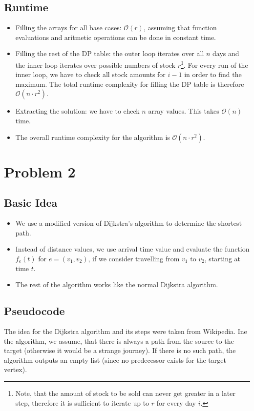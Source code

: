 \documentclass[12pt]{article}
\begin{document}
\subsection*{Runtime}
\begin{itemize}
	\item Filling the arrays for all base cases: $\mathcal{O}(r)$, assuming that function evaluations and aritmetic operations can be done in constant time.
	\item Filling the rest of the DP table: the outer loop iterates over all $n$ days and the inner loop iterates over possible numbers of stock $r$\footnote{Note, that the amount of stock to be sold can never get greater in a later step, therefore it is sufficient to iterate up to $r$ for every day $i$.}. For every run of the inner loop, we have to check all stock amounts for $i-1$ in order to find the maximum. The total runtime complexity for filling the DP table is therefore $\mathcal{O}(n \cdot r^2)$.
	\item Extracting the solution: we have to check $n$ array values. This takes $\mathcal{O}(n)$ time.
	\item The overall runtime complexity for the algorithm is $\mathcal{O}(n \cdot r^2)$.
\end{itemize}

\section*{Problem 2}
\subsection*{Basic Idea}
\begin{itemize}
	\item We use a modified version of Dijkstra's algorithm to determine the shortest path.
	\item Instead of distance values, we use arrival time value and evaluate the function $f_e(t)$ for $e=(v_1, v_2)$, if we consider travelling from $v_1$ to $v_2$, starting at time $t$.
	\item The rest of the algorithm works like the normal Dijkstra algorithm.
\end{itemize}

\subsection*{Pseudocode}
The idea for the Dijkstra algorithm and its steps were taken from Wikipedia. Ine the algorithm, we assume, that there is always a path from the source to the target (otherwise it would be a strange journey). If there is no such path, the algorithm outputs an empty list (since no predecessor exists for the target vertex).
\end{document}
